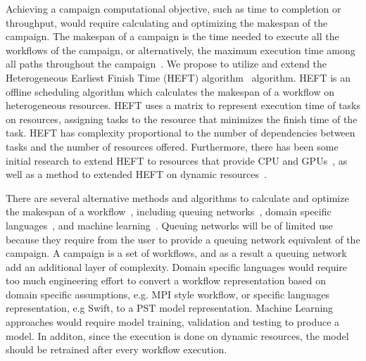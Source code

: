 Achieving a campaign computational objective, such as time to completion or throughput, would require calculating and optimizing the makespan of the campaign.
The makespan of a campaign is the time needed to execute all the workflows of the campaign, or alternatively, the maximum execution time among all paths throughout the campaign~\cite{chirkin2017execution}.
We propose to utilize and extend the Heterogeneous Earliest Finish Time (HEFT) algorithm~\cite{topcuoglu2002performance} algorithm.
HEFT is an offline scheduling algorithm which calculates the makespan of a workflow on heterogeneous resources.
HEFT uses a matrix to represent execution time of tasks on resources, assigning tasks to the resource that minimizes the finish time of the task. 
HEFT has complexity proportional to the number of dependencies between tasks and the number of resources offered.
Furthermore, there has been some initial research to extend HEFT to resources that provide CPU and GPUs~\cite{shetti2013optimization}, as well as a method to extended HEFT on dynamic resources~\cite{dong2007pfas}.

There are several alternative methods and algorithms to calculate and optimize the makespan of a workflow~\cite{lu2019review}, including queuing networks~\cite{yao2019throughput,bao2019performance}, domain specific languages~\cite{carothers2017durango,maheshwari2016workflow}, and machine learning~\cite{witt2019predictive,pumma2017runtime}.
Queuing networks will be of limited use because they require from the user to provide a queuing network equivalent of the campaign.
A campaign is a set of workflows, and as a result a queuing network add an additional layer of complexity.
Domain specific languages would require too much engineering effort to convert a workflow representation based on domain specific assumptions, e.g. MPI style workflow, or specific languages representation, e.g Swift, to a PST model representation.
Machine Learning approaches would require model training, validation and testing to produce a model.
In additon, since the execution is done on dynamic resources, the model should be retrained after every workflow execution.


